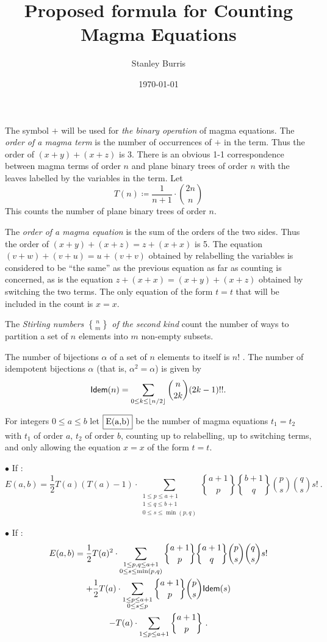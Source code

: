 \documentclass[12pt]{amsart}
\title{Proposed formula for Counting Magma Equations}
\author{Stanley Burris}
\date{\today}
\newcommand{\Idem}{{\sf Idem}}
\begin{document}
\maketitle

The symbol $+$ will be used for {\it the binary operation} of magma equations. The {\it order of a magma term} is the number of occurrences of $+$ in the term. Thus the order of $(x+y) + (x + z)$ is 3. There is an obvious 1-1 correspondence between magma terms of order $n$ and plane binary trees of order $n$ with the leaves labelled by the variables in the term. Let
$$
T(n) \coloneq \frac{1}{n+1} \cdot {2n \choose n}
$$
This counts the number of plane binary trees of order $n$.

The {\it order of a magma equation} is the sum of the orders of the two sides. Thus the order of $(x+y) +(x+z) = z + (x +x)$ is 5. 
The equation $(v+w) +(v+u) = u + (v +v)$ obtained by relabelling the variables is considered to be ``the same'' as the previous equation as far as counting is concerned, as is the equation 
$ z + (x +x) = (x+y) +(x+z) $
obtained by switching the two terms. The only equation of the form $t = t$ that will be included in the count is $x=x$.

The {\it Stirling numbers $n \brace m$ of the second kind} count the number of ways to partition a set of $n$ elements into $m$ non-empty subsets.

The number of bijections $\alpha$ of a set of $n$ elements to itself is $n!$ .
The number of idempotent bijections $\alpha$ (that is, $\alpha^2 = \alpha$) is given by
$$
\Idem(n) = \sum_{0 \leq k \leq \lfloor n/2 \rfloor}  {n\choose 2k} (2k-1)!!.
$$

For integers $0 \le a \le b$ let $\fbox{E(a,b)}$ be the number of magma equations $t_1 = t_2$ with $t_1$ of order $a$, $t_2$ of order $b$, counting up to relabelling, up to switching terms, and only allowing the equation $x=x$ of the form $t=t$. 

\pagebreak
$\bullet$ If : 
$$
E(a,b) = \frac{1}{2} T(a)(T(a) - 1)\cdot \sum_{\substack{1 \le p \le a+1\\ 1 \le q \le b+1\\0\le s \le \min(p,q)}} 
{a+1 \brace p} {b+1 \brace q} {p \choose s} {q \choose s} s! \ .
$$

$\bullet$ If : 
\begin{multline*}
E(a,b) = \frac{1}{2} T(a)^2\cdot \sum_{\substack{1 \le p,q \le a+1\\ 0\le s \le \min(p,q)}} 
{a+1 \brace p} {a+1 \brace q} {p \choose s} {q \choose s} s! \\
+ \frac{1}{2} T(a) \cdot \sum_{\substack{1 \le p \le a+1\\ 0\le s \le p}} 
{a+1 \brace p}  {p \choose s}  \Idem(s)\\
- T(a)\cdot \sum_{1\le p \le a+1}  {a+1 \brace p} \ .
\end{multline*}
\end{document}
